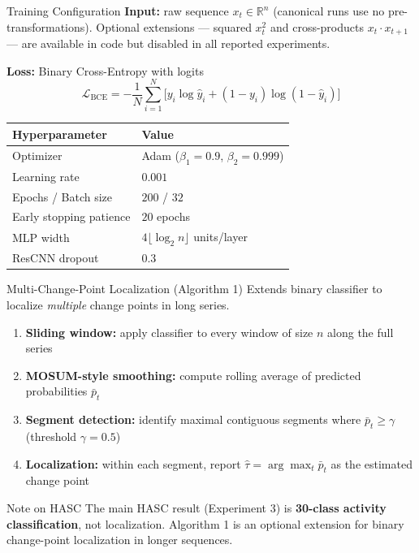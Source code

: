 \documentclass[8.5pt]{beamer}
\begin{document}
\begin{frame}{Training Configuration}
  \textbf{Input:} raw sequence $x_t \in \mathbb{R}^n$ (canonical runs use no pre-transformations).
  Optional extensions — squared $x_t^2$ and cross-products $x_t\!\cdot\!x_{t+1}$ — are
  available in code but disabled in all reported experiments.

  \medskip
  \textbf{Loss:} Binary Cross-Entropy with logits
  \[
    \mathcal{L}_{\text{BCE}} = -\frac{1}{N}\sum_{i=1}^{N}
      \bigl[y_i\log\hat{y}_i + (1-y_i)\log(1-\hat{y}_i)\bigr]
  \]

  \medskip
  \begin{center}
  \begin{tabular}{@{}ll@{}}
    \toprule
    Hyperparameter & Value \\
    \midrule
    Optimizer & Adam \cite{kingma2015adam} ($\beta_1=0.9$, $\beta_2=0.999$) \\
    Learning rate & $0.001$ \\
    Epochs / Batch size & $200$ / $32$ \\
    Early stopping patience & $20$ epochs \\
    MLP width & $4\lfloor\log_2 n\rfloor$ units/layer \\
    ResCNN dropout & $0.3$ \\
    \bottomrule
  \end{tabular}
  \end{center}
\end{frame}

\begin{frame}{Multi-Change-Point Localization (Algorithm 1) \cite{li2024automatic}}
  Extends binary classifier to localize \emph{multiple} change points in long series.

  \bigskip
  \begin{enumerate}
    \item \textbf{Sliding window:} apply classifier to every window of size $n$
          along the full series
    \item \textbf{MOSUM-style smoothing:} compute rolling average of predicted
          probabilities $\bar{p}_t$
    \item \textbf{Segment detection:} identify maximal contiguous segments where
          $\bar{p}_t \ge \gamma$ (threshold $\gamma = 0.5$)
    \item \textbf{Localization:} within each segment, report
          $\hat\tau = \arg\max_t \bar{p}_t$ as the estimated change point
  \end{enumerate}

  \bigskip
  \begin{block}{Note on HASC}
    The main HASC result (Experiment 3) is \textbf{30-class activity classification},
    not localization. Algorithm 1 is an optional extension for binary change-point
    localization in longer sequences.
  \end{block}
\end{frame}
\end{document}
